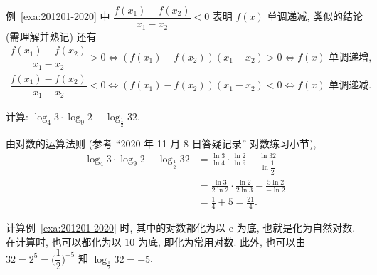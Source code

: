 例~\ref{exa:201201-2020} 中 $\dfrac{f(x_1)-f(x_2)}{x_1-x_2}<0$ 表明 $f(x)$ 单调递减, 类似的结论 (需理解并熟记) 还有
\[\begin{gathered}
    \dfrac{f(x_1)-f(x_2)}{x_1-x_2}>0
    \Leftrightarrow (f(x_1)-f(x_2))(x_1-x_2)>0
    \Leftrightarrow \text{$f(x)$ 单调递增,}\\
    \dfrac{f(x_1)-f(x_2)}{x_1-x_2}<0
    \Leftrightarrow (f(x_1)-f(x_2))(x_1-x_2)<0
    \Leftrightarrow \text{$f(x)$ 单调递减.}
\end{gathered}\]

\begin{example}\label{exa:201201-2030}
    计算: $\log_4 3\cdot \log_9 2- \log_{\frac12} 32$.
\end{example}
\begin{solution}
    由对数的运算法则 (参考 ``2020 年 11 月 8 日答疑记录'' 对数练习小节), 
    \[\begin{aligned}
        \log_4 3\cdot \log_9 2- \log_{\frac12} 32
        &= \frac{\ln 3}{\ln 4}\cdot \frac{\ln 2}{\ln 9}
            - \frac{\ln 32}{\ln\dfrac12}\\
        &= \frac{\ln 3}{2\ln 2}\cdot \frac{\ln 2}{2\ln 3}
            - \frac{5\ln 2}{-\ln 2}\\
        &= \frac14+5= \frac{21}4.
    \end{aligned}\]
\end{solution}

计算例~\ref{exa:201201-2020} 时, 其中的对数都化为以  $\mathrm{e}$ 为底, 也就是化为自然对数. 在计算时, 也可以都化为以 $10$ 为底, 即化为常用对数. 此外, 也可以由 $32= 2^5= \bigg(\dfrac12\biggr)^{-5}$ 知 $\log_{\frac12} 32= -5$.

